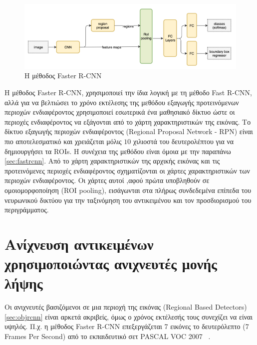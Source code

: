 \begin{figure}[htbp]
  \begin{center}
    \includegraphics[width=0.9\maxwidth]{../figures/fasterrcnn2.png}
    \caption{Η μέθοδος Faster R-CNN\label{fig:fasterrcnn}}
   \end{center}
\end{figure}

H μέθοδος Faster R-CNN, χρησιμοποιεί την ίδια λογική με τη μέθοδο Fast R-CNN,
αλλά για να βελτιώσει το χρόνο εκτέλεσης της μεθόδου εξαγωγής προτεινόμενων
περιοχών ενδιαφέροντος χρησιμοποιεί εσωτερικά ένα μαθησιακό δίκτυο ώστε οι
περιοχές ενδιαφέροντος να εξάγονται από το χάρτη χαρακτηριστικών της εικόνας. Το
δίκτυο εξαγωγής περιοχών ενδιαφέροντος (Regional Proposal Network - RPN) είναι
πιο αποτελεσματικό και χρειάζεται μόλις $10$ χιλιοστά του δευτερολέπτου για να
δημιουργήσει τα ROIs. Η συνέχεια της μεθόδου είναι όμοια με την παραπάνω \ref{sec:fastrcnn}.
Από το χάρτη χαρακτηριστικών της αρχικής εικόνας και τις προτεινόμενες περιοχές
ενδιαφέροντος σχηματίζονται οι χάρτες χαρακτηριστικών των περιοχών ενδιαφέροντος.
Οι χάρτες αυτοί ,αφού πρώτα υποβληθούν σε ομοιομορφοποίηση (ROI pooling), εισάγωνται
στα πλήρως συνδεδεμένα επίπεδα του νευρωνικού δικτύου για την ταξινόμηση του
αντικειμένου και τον προσδιορισμού του περιγράμματος.


\section{Ανίχνευση αντικειμένων χρησιμοποιώντας ανιχνευτές μονής λήψης}\label{sec:objssd}

Οι ανιχνευτές βασιζόμενοι σε μια περιοχή της εικόνας (Regional Based Detectors)
\ref{sec:objrcnn} είναι αρκετά ακριβείς, όμως ο χρόνος εκτέλεσής τους συνεχίζει
να είναι υψηλός. Π.χ. η μέθοδος Faster R-CNN επεξεργάζεται 7 εικόνες το δευτερόλεπτο
(7 Frames Per Second) από το εκπαιδευτικό σετ PASCAL VOC 2007~\cite{pascal-voc-2007} .

\begin{listing}
\end{listing}


